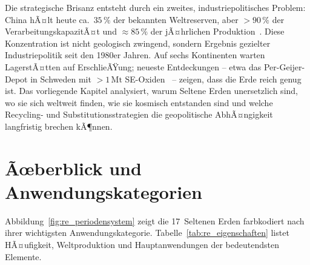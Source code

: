 ﻿\documentclass[12pt, a4paper]{report}
\theoremstyle{definition}
\theoremstyle{remark}
\begin{document}
Die strategische Brisanz entsteht durch ein zweites, industriepolitisches
Problem: China hÃ¤lt heute ca.~$35\,\%$ der bekannten Weltreserven, aber
$>90\,\%$ der VerarbeitungskapazitÃ¤t und $\approx 85\,\%$ der jÃ¤hrlichen
Produktion~\cite{massari2013}. Diese Konzentration ist nicht geologisch
zwingend, sondern Ergebnis gezielter Industriepolitik seit den 1980er Jahren.
Auf sechs Kontinenten warten LagerstÃ¤tten auf ErschlieÃŸung; neueste
Entdeckungen -- etwa das Per-Geijer-Depot in Schweden mit $>1\,\text{Mt}$
SE-Oxiden~\cite{lkab2023} -- zeigen, dass die Erde reich genug ist. Das
vorliegende Kapitel analysiert, warum Seltene Erden unersetzlich sind, wo
sie sich weltweit finden, wie sie kosmisch entstanden sind und welche
Recycling- und Substitutionsstrategien die geopolitische AbhÃ¤ngigkeit
langfristig brechen kÃ¶nnen.

\section{Ãœberblick und Anwendungskategorien}
\label{ssec:re_uebersicht}

\noindent Abbildung~\ref{fig:re_periodensystem} zeigt die 17~Seltenen
Erden farbkodiert nach ihrer wichtigsten Anwendungskategorie.
Tabelle~\ref{tab:re_eigenschaften} listet HÃ¤ufigkeit, Weltproduktion und
Hauptanwendungen der bedeutendsten Elemente.
\end{document}
